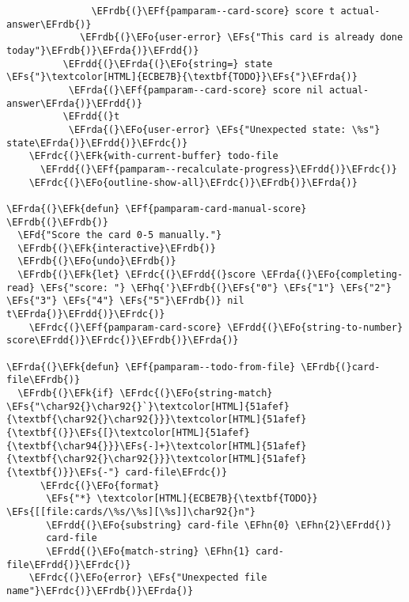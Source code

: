 \documentclass[a4wide,10pt]{article}
\newcommand{\EFs}[1]{\textcolor{EFs}{#1}} %
\newcommand{\EFd}[1]{\textcolor{EFd}{#1}} %
\newcommand{\EFk}[1]{\textcolor{EFk}{#1}} %
\newcommand{\EFf}[1]{\textcolor{EFf}{#1}} %
\newcommand{\EFo}[1]{\textcolor{EFo}{#1}} %
\newcommand{\EFhn}[1]{\textcolor{EFhn}{\textbf{#1}}} %
\newcommand{\EFhq}[1]{\textcolor{EFhq}{#1}} %
\newcommand{\EFrda}[1]{\textcolor{EFrda}{#1}} %
\newcommand{\EFrdb}[1]{\textcolor{EFrdb}{#1}} %
\newcommand{\EFrdc}[1]{\textcolor{EFrdc}{#1}} %
\newcommand{\EFrdd}[1]{\textcolor{EFrdd}{#1}} %
\begin{document}
\begin{Code}
\begin{Verbatim}
               \EFrdb{(}\EFf{pamparam--card-score} score t actual-answer\EFrdb{)}
             \EFrdb{(}\EFo{user-error} \EFs{"This card is already done today"}\EFrdb{)}\EFrda{)}\EFrdd{)}
          \EFrdd{(}\EFrda{(}\EFo{string=} state \EFs{"}\textcolor[HTML]{ECBE7B}{\textbf{TODO}}\EFs{"}\EFrda{)}
           \EFrda{(}\EFf{pamparam--card-score} score nil actual-answer\EFrda{)}\EFrdd{)}
          \EFrdd{(}t
           \EFrda{(}\EFo{user-error} \EFs{"Unexpected state: \%s"} state\EFrda{)}\EFrdd{)}\EFrdc{)}
    \EFrdc{(}\EFk{with-current-buffer} todo-file
      \EFrdd{(}\EFf{pamparam--recalculate-progress}\EFrdd{)}\EFrdc{)}
    \EFrdc{(}\EFo{outline-show-all}\EFrdc{)}\EFrdb{)}\EFrda{)}

\EFrda{(}\EFk{defun} \EFf{pamparam-card-manual-score} \EFrdb{(}\EFrdb{)}
  \EFd{"Score the card 0-5 manually."}
  \EFrdb{(}\EFk{interactive}\EFrdb{)}
  \EFrdb{(}\EFo{undo}\EFrdb{)}
  \EFrdb{(}\EFk{let} \EFrdc{(}\EFrdd{(}score \EFrda{(}\EFo{completing-read} \EFs{"score: "} \EFhq{'}\EFrdb{(}\EFs{"0"} \EFs{"1"} \EFs{"2"} \EFs{"3"} \EFs{"4"} \EFs{"5"}\EFrdb{)} nil t\EFrda{)}\EFrdd{)}\EFrdc{)}
    \EFrdc{(}\EFf{pamparam-card-score} \EFrdd{(}\EFo{string-to-number} score\EFrdd{)}\EFrdc{)}\EFrdb{)}\EFrda{)}

\EFrda{(}\EFk{defun} \EFf{pamparam--todo-from-file} \EFrdb{(}card-file\EFrdb{)}
  \EFrdb{(}\EFk{if} \EFrdc{(}\EFo{string-match} \EFs{"\char92{}\char92{}`}\textcolor[HTML]{51afef}{\textbf{\char92{}\char92{}}}\textcolor[HTML]{51afef}{\textbf{(}}\EFs{[}\textcolor[HTML]{51afef}{\textbf{\char94{}}}\EFs{-]+}\textcolor[HTML]{51afef}{\textbf{\char92{}\char92{}}}\textcolor[HTML]{51afef}{\textbf{)}}\EFs{-"} card-file\EFrdc{)}
      \EFrdc{(}\EFo{format}
       \EFs{"*} \textcolor[HTML]{ECBE7B}{\textbf{TODO}} \EFs{[[file:cards/\%s/\%s][\%s]]\char92{}n"}
       \EFrdd{(}\EFo{substring} card-file \EFhn{0} \EFhn{2}\EFrdd{)}
       card-file
       \EFrdd{(}\EFo{match-string} \EFhn{1} card-file\EFrdd{)}\EFrdc{)}
    \EFrdc{(}\EFo{error} \EFs{"Unexpected file name"}\EFrdc{)}\EFrdb{)}\EFrda{)}


\end{Verbatim}
\end{Code}
\end{document}
